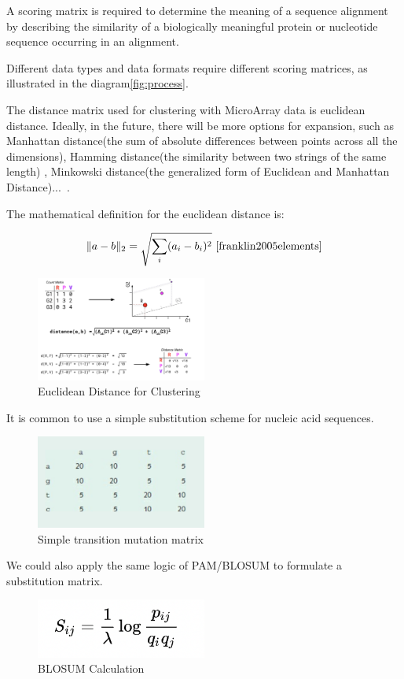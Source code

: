\documentclass[]{final_report}
\begin{document}
A scoring matrix is required to determine the meaning of a sequence alignment by describing the similarity of a biologically meaningful protein or nucleotide sequence occurring in an alignment.

Different data types and data formats require different scoring matrices, as illustrated in the diagram\ref{fig:process}.

The distance matrix used for clustering with MicroArray data is euclidean distance. Ideally, in the future, there will be more options for expansion, such as Manhattan distance(the sum of absolute differences between points across all the dimensions), Hamming distance(the similarity between two strings of the same length) , Minkowski distance(the generalized form of Euclidean and Manhattan Distance)...~\cite{xu2011distance}.

The mathematical definition for the euclidean distance is:

\begin{equation}
\|a-b\|_{2}={\sqrt{\sum_{i}(a_{i}-b_{i})^{2}}}~\cite{franklin2005elements}
\end{equation}

\begin{figure}[H]
    \centering
    \includegraphics[width=0.5\textwidth]{EuclideanDistance.png}
    \caption{Euclidean Distance for Clustering~\cite{Batut_2018}}
    \label{fig:euclidean_distance}
\end{figure}

It is common to use a simple substitution scheme for nucleic acid sequences.
\begin{figure}[H]
    \centering
    \includegraphics[width=0.5\textwidth]{transitioin .png}
    \caption{Simple transition mutation matrix}
    \label{fig:transition}
\end{figure}
We could also apply the same logic of PAM/BLOSUM to formulate a substitution matrix. 
\begin{figure}[H]
    \centering
    \includegraphics[width=0.5\textwidth]{blosumformula.png}
    \caption{BLOSUM Calculation}
    \label{fig:blosum}
\end{figure}
\end{document}
